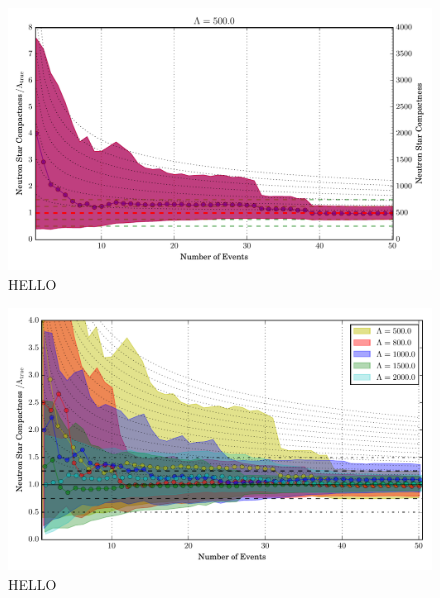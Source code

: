 \documentclass[aps,prd,amsmath,floats,floatfix, twocolumn,
superscriptaddress,nofootinbib,showpacs]{revtex4-1}
\begin{document}
\begin{figure}
\includegraphics[width=1.\columnwidth]{plots/FillBetweenNormErrorBarsLambda_vs_N_L500.pdf}
\caption{HELLO
}
\label{fig:TT_Lambda_vs_N_L500_2000_CI90_0}
\end{figure}
%
% 
\begin{figure}
\centering    
\includegraphics[width=1.\columnwidth]{plots/FillBetweenRelErrorBarsLambda_vs_NShifted_AllLambda.pdf}
\caption{HELLO
}
\label{fig:TT_Lambda_vs_N_L500_2000_CI90_0_AllInOne}
\end{figure}
%
% 
\end{document}
